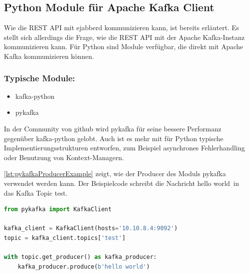 \documentclass[a4paper,titlepage,halfparskip,12pt]{scrreprt}
\begin{document}
\begin{onehalfspacing}
\pagebreak

\section{Python Module für Apache Kafka Client}
\label{sec:KafkaModul}

Wie die \acs{REST} \acs{API} mit ejabberd kommunizieren kann, ist bereits erläutert. Es stellt sich allerdings die Frage, wie die \acs{REST} \acs{API} mit der Apache Kafka-Instanz kommunizieren kann. Für Python sind Module verfügbar, die direkt mit Apache Kafka kommunizieren können.

\subsubsection*{Typische Module:}

\begin{itemize}
\item kafka-python
\item pykafka
\end{itemize}

In der Community von github wird pykafka für seine bessere Performanz gegenüber kafka-python gelobt. Auch ist es mehr mit für Python typische Implementierungsstrukturen entworfen, zum Beispiel asynchrones Fehlerhandling oder Benutzung von Kontext-Managern.\cite{pykafkaGithubMeaning}

\autoref{lst:pykafkaProducerExample} zeigt, wie der Producer des Moduls pykafka verwendet werden kann. Der Beispielcode schreibt die Nachricht \glqq hello world\grqq\ in das Kafka Topic \glqq test\grqq.

\begin{lstlisting}[language=python, caption={Beispiel: Verwendung des Producers des Moduls pykafka}, label={lst:pykafkaProducerExample}]
from pykafka import KafkaClient

kafka_client = KafkaClient(hosts='10.10.8.4:9092')
topic = kafka_client.topics['test']

with topic.get_producer() as kafka_producer:
    kafka_producer.produce(b'hello world')
\end{lstlisting}


\end{onehalfspacing}
\end{document}
